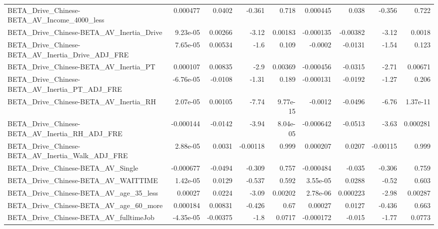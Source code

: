 \begin{tabular}{lrrrrrrrr}
BETA\_Drive\_Chinese-BETA\_AV\_Income\_4000\_less        &    0.000477 &       0.0402 &   -0.361 &    0.718 &   0.000445 &       0.038 &       -0.356 &         0.722 \\
BETA\_Drive\_Chinese-BETA\_AV\_Inertia\_Drive           &    9.23e-05 &      0.00266 &    -3.12 &  0.00183 &  -0.000135 &    -0.00382 &        -3.12 &        0.0018 \\
BETA\_Drive\_Chinese-BETA\_AV\_Inertia\_Drive\_ADJ\_FRE   &    7.65e-05 &      0.00534 &     -1.6 &    0.109 &    -0.0002 &     -0.0131 &        -1.54 &         0.123 \\
BETA\_Drive\_Chinese-BETA\_AV\_Inertia\_PT              &    0.000107 &      0.00835 &     -2.9 &  0.00369 &  -0.000456 &     -0.0315 &        -2.71 &       0.00671 \\
BETA\_Drive\_Chinese-BETA\_AV\_Inertia\_PT\_ADJ\_FRE      &   -6.76e-05 &      -0.0108 &    -1.31 &    0.189 &  -0.000131 &     -0.0192 &        -1.27 &         0.206 \\
BETA\_Drive\_Chinese-BETA\_AV\_Inertia\_RH              &    2.07e-05 &      0.00105 &    -7.74 & 9.77e-15 &    -0.0012 &     -0.0496 &        -6.76 &      1.37e-11 \\
BETA\_Drive\_Chinese-BETA\_AV\_Inertia\_RH\_ADJ\_FRE      &   -0.000144 &      -0.0142 &    -3.94 & 8.04e-05 &  -0.000642 &     -0.0513 &        -3.63 &      0.000281 \\
BETA\_Drive\_Chinese-BETA\_AV\_Inertia\_Walk\_ADJ\_FRE    &    2.88e-05 &       0.0031 & -0.00118 &    0.999 &   0.000207 &      0.0207 &     -0.00115 &         0.999 \\
BETA\_Drive\_Chinese-BETA\_AV\_Single                  &   -0.000677 &      -0.0494 &   -0.309 &    0.757 &  -0.000484 &      -0.035 &       -0.306 &         0.759 \\
BETA\_Drive\_Chinese-BETA\_AV\_WAITTIME                &    1.42e-05 &       0.0129 &   -0.537 &    0.592 &   3.55e-05 &      0.0288 &        -0.52 &         0.603 \\
BETA\_Drive\_Chinese-BETA\_AV\_age\_35\_less             &     0.00027 &       0.0224 &    -3.09 &  0.00202 &   2.78e-06 &    0.000223 &        -2.98 &       0.00287 \\
BETA\_Drive\_Chinese-BETA\_AV\_age\_60\_more             &    0.000184 &      0.00831 &   -0.426 &     0.67 &    0.00027 &      0.0127 &       -0.436 &         0.663 \\
BETA\_Drive\_Chinese-BETA\_AV\_fulltimeJob             &   -4.35e-05 &     -0.00375 &     -1.8 &   0.0717 &  -0.000172 &      -0.015 &        -1.77 &        0.0773 \\

\end{tabular}
